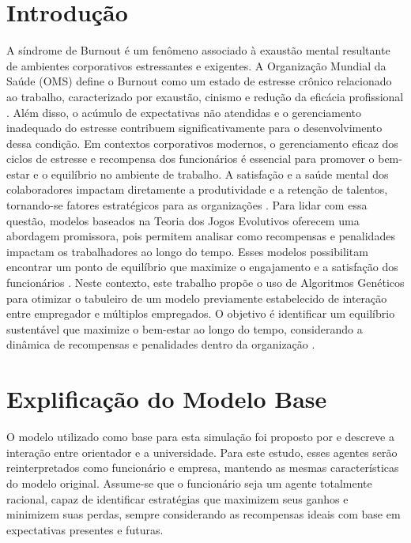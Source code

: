 \documentclass[
	article,			%
	11pt,				%
	oneside,			%
	a4paper,			%
	english,			%
	brazil,				%
	sumario=tradicional
	]{abntex2}
\begin{document}
\frenchspacing 

\maketitle

\section*{Introdução}

A síndrome de Burnout é um fenômeno associado à exaustão mental resultante de ambientes corporativos estressantes e exigentes. A Organização Mundial da Saúde (OMS) define o Burnout como um estado de estresse crônico relacionado ao trabalho, caracterizado por exaustão, cinismo e redução da eficácia profissional \cite{Downey2023}. Além disso, o acúmulo de expectativas não atendidas e o gerenciamento inadequado do estresse contribuem significativamente para o desenvolvimento dessa condição.
Em contextos corporativos modernos, o gerenciamento eficaz dos ciclos de estresse e recompensa dos funcionários é essencial para promover o bem-estar e o equilíbrio no ambiente de trabalho. A satisfação e a saúde mental dos colaboradores impactam diretamente a produtividade e a retenção de talentos, tornando-se fatores estratégicos para as organizações  \cite{Slusarz2022}.
Para lidar com essa questão, modelos baseados na Teoria dos Jogos Evolutivos oferecem uma abordagem promissora, pois permitem analisar como recompensas e penalidades impactam os trabalhadores ao longo do tempo. Esses modelos possibilitam encontrar um ponto de equilíbrio que maximize o engajamento e a satisfação dos funcionários \cite{Sanfey2003}.
Neste contexto, este trabalho propõe o uso de Algoritmos Genéticos para otimizar o tabuleiro de um modelo previamente estabelecido \cite{Zhang2020Burnout} de interação entre empregador e 
 múltiplos empregados. O objetivo é identificar um equilíbrio sustentável que maximize o bem-estar ao longo do tempo, considerando a dinâmica de recompensas e penalidades dentro da organização \cite{Zhang2020Burnout}.




\section{Explificação do Modelo Base}
O modelo utilizado como base para esta simulação foi proposto por \cite{Zhang2020Burnout} e descreve a interação entre orientador e a universidade. Para este estudo, esses agentes serão reinterpretados como funcionário e empresa, mantendo as mesmas características do modelo original. Assume-se que o funcionário seja um agente totalmente racional, capaz de identificar estratégias que maximizem seus ganhos e minimizem suas perdas, sempre considerando as recompensas ideais com base em expectativas presentes e futuras.
\end{document}
